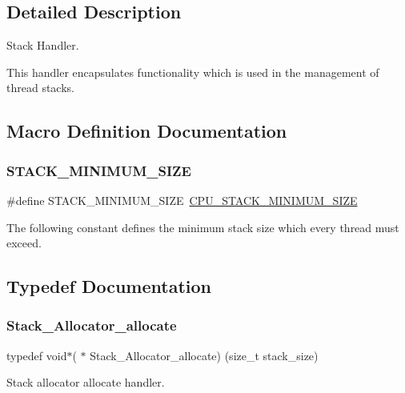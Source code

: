 \subsection{Detailed Description}
Stack Handler. 

This handler encapsulates functionality which is used in the management of thread stacks. 

\subsection{Macro Definition Documentation}
\mbox{\label{group__RTEMSScoreStack_gaef3654e2c6c9afbd5dbe22b84fc22fc5}} 
\subsubsection{\texorpdfstring{STACK\_MINIMUM\_SIZE}{STACK\_MINIMUM\_SIZE}}
{\footnotesize\ttfamily \#define S\+T\+A\+C\+K\+\_\+\+M\+I\+N\+I\+M\+U\+M\+\_\+\+S\+I\+ZE~\mbox{\hyperlink{sparc_2include_2rtems_2score_2cpu_8h_a4c92ceea7549cc7b21db2c466916b733}{C\+P\+U\+\_\+\+S\+T\+A\+C\+K\+\_\+\+M\+I\+N\+I\+M\+U\+M\+\_\+\+S\+I\+ZE}}}

The following constant defines the minimum stack size which every thread must exceed. 

\subsection{Typedef Documentation}
\mbox{\label{group__RTEMSScoreStack_ga1e4edf42aa30aeab80fefb866e892a3d}} 
\subsubsection{\texorpdfstring{Stack\_Allocator\_allocate}{Stack\_Allocator\_allocate}}
{\footnotesize\ttfamily typedef void$\ast$( $\ast$ Stack\+\_\+\+Allocator\+\_\+allocate) (size\+\_\+t stack\+\_\+size)}



Stack allocator allocate handler. 


